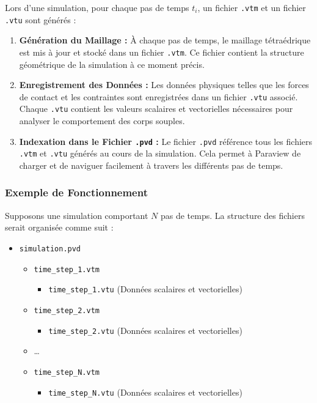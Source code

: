 Lors d'une simulation, pour chaque pas de temps \( t_i \), un fichier \texttt{.vtm} et un fichier \texttt{.vtu} sont générés :

\begin{enumerate}
    \item \textbf{Génération du Maillage :}  
    À chaque pas de temps, le maillage tétraédrique est mis à jour et stocké dans un fichier \texttt{.vtm}. Ce fichier contient la structure géométrique de la simulation à ce moment précis.
    
    \item \textbf{Enregistrement des Données :}  
    Les données physiques telles que les forces de contact et les contraintes sont enregistrées dans un fichier \texttt{.vtu} associé. Chaque \texttt{.vtu} contient les valeurs scalaires et vectorielles nécessaires pour analyser le comportement des corps souples.
    
    \item \textbf{Indexation dans le Fichier \texttt{.pvd} :}  
    Le fichier \texttt{.pvd} référence tous les fichiers \texttt{.vtm} et \texttt{.vtu} générés au cours de la simulation. Cela permet à Paraview de charger et de naviguer facilement à travers les différents pas de temps.
\end{enumerate}

\subsubsection{Exemple de Fonctionnement}

Supposons une simulation comportant \( N \) pas de temps. La structure des fichiers serait organisée comme suit :

\begin{itemize}
    \item \texttt{simulation.pvd}  
    \begin{itemize}
        \item \texttt{time\_step\_1.vtm}
        \begin{itemize}
            \item \texttt{time\_step\_1.vtu} (Données scalaires et vectorielles)
        \end{itemize}
        \item \texttt{time\_step\_2.vtm}
        \begin{itemize}
            \item \texttt{time\_step\_2.vtu} (Données scalaires et vectorielles)
        \end{itemize}
        \item \dots
        \item \texttt{time\_step\_N.vtm}
        \begin{itemize}
            \item \texttt{time\_step\_N.vtu} (Données scalaires et vectorielles)
        \end{itemize}
    \end{itemize}
\end{itemize}

